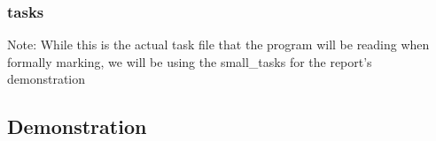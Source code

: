 \documentclass[a4paper, 12pt, titlepage]{article}
\begin{document}
\subsubsection{tasks}
\begin{multicols}{4}

\end{multicols}

Note: While this is the actual task file that the program will be reading when
formally marking, we will be using the small\_tasks for the report's
demonstration
\newpage

\subsection{Demonstration}

\newpage
\end{document}
